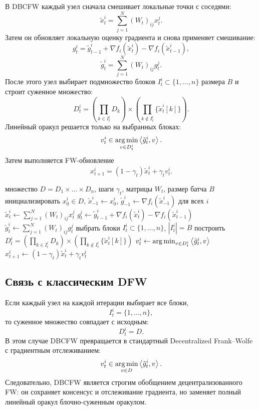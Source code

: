 В DBCFW каждый узел сначала смешивает локальные точки с соседями:
\[
    \tilde x_t^i=
    \sum_{j=1}^{N}(W_t)_{ij}x_t^j.
\]
Затем он обновляет локальную оценку градиента и снова применяет смешивание:
\[
    g_t^i=
    \tilde g_{t-1}^i
    +
    \nabla f_i(\tilde x_t^i)
    -
    \nabla f_i(\tilde x_{t-1}^i),
\]
\[
    \tilde g_t^i=
    \sum_{j=1}^{N}(W_t)_{ij}g_t^j.
\]
После этого узел выбирает подмножество блоков $I_t^i\subset\{1,\dots,n\}$ размера $B$ и строит суженное множество:
\[
    D_t^i
    =
    \left(\prod_{k\in I_t^i}D_k\right)
    \times
    \left(\prod_{k\notin I_t^i}\{\tilde x_t^i[k]\}\right).
\]
Линейный оракул решается только на выбранных блоках:
\[
    v_t^i
    \in
    \operatorname*{arg\,min}_{v\in D_t^i}
    \left\langle \tilde g_t^i, v \right\rangle.
\]
Затем выполняется FW-обновление
\[
    x_{t+1}^i
    =
    (1-\gamma_t)\tilde x_t^i+\gamma_t v_t^i.
\]

\begin{algorithm}
\caption{Decentralized Block-Coordinate Frank--Wolfe}
\label{alg:dbcfw}
\begin{algorithmic}
\REQUIRE множество $D=D_1\times\dots\times D_n$, шаги $\gamma_t$, матрицы $W_t$, размер батча $B$
\STATE инициализировать $x_0^i\in D$, $\tilde x_{-1}^i\gets x_0^i$, $\tilde g_{-1}^i\gets\nabla f_i(\tilde x_{-1}^i)$ для всех $i$
\STATE $\tilde x_t^i\gets\sum_{j=1}^{N}(W_t)_{ij}x_t^j$
\STATE $g_t^i\gets\tilde g_{t-1}^i+\nabla f_i(\tilde x_t^i)-\nabla f_i(\tilde x_{t-1}^i)$
\STATE $\tilde g_t^i\gets\sum_{j=1}^{N}(W_t)_{ij}g_t^j$
\STATE выбрать блоки $I_t^i\subset\{1,\ldots,n\}$, $|I_t^i|=B$
\STATE построить $D_t^i=\left(\prod_{k\in I_t^i}D_k\right)\times\left(\prod_{k\notin I_t^i}\{\tilde x_t^i[k]\}\right)$
\STATE $v_t^i\gets\operatorname*{arg\,min}_{v\in D_t^i}\left\langle \tilde g_t^i, v \right\rangle$
\STATE $x_{t+1}^i\gets(1-\gamma_t)\tilde x_t^i+\gamma_t v_t^i$
\ENDFOR
\ENDFOR
\end{algorithmic}
\end{algorithm}

\subsection{Связь с классическим DFW}

Если каждый узел на каждой итерации выбирает все блоки,
\[
    I_t^i=\{1,\ldots,n\},
\]
то суженное множество совпадает с исходным:
\[
    D_t^i=D.
\]
В этом случае DBCFW превращается в стандартный Decentralized Frank--Wolfe с градиентным отслеживанием:
\[
    v_t^i\in\operatorname*{arg\,min}_{v\in D}\left\langle \tilde g_t^i, v \right\rangle.
\]
Следовательно, DBCFW является строгим обобщением децентрализованного FW: он сохраняет консенсус и отслеживание градиента, но заменяет полный линейный оракул блочно-суженным оракулом.

